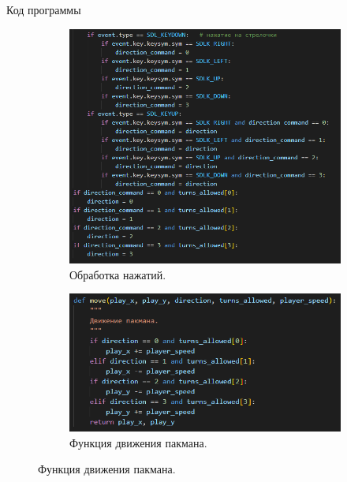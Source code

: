 \documentclass[10pt,a4paper,mathserif]{beamer}
\begin{document}
\begin{frame}{Код программы}
    \begin{figure}
    \centering
    \begin{subfigure}{.5\textwidth}
      \centering
      \includegraphics[width=.98\linewidth]{src/code1.png}
      \caption{Обработка нажатий.}
    \end{subfigure}%
    \begin{subfigure}{.5\textwidth}
      \centering
      \includegraphics[width=.98\linewidth]{src/code2.png}
      \caption{Функция движения пакмана.}
    \end{subfigure}
    \end{figure}
\end{frame}
\end{document}
